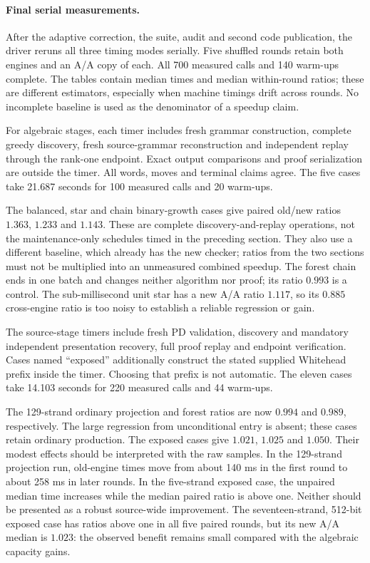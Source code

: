 \paragraph{Final serial measurements.}
After the adaptive correction, the suite, audit and second code publication,
the driver reruns all three timing modes serially. Five shuffled rounds retain
both engines and an A/A copy of each. All 700 measured calls and 140 warm-ups
complete. The tables contain median times and median within-round ratios;
these are different estimators, especially when machine timings drift across
rounds. No incomplete baseline is used as the denominator of a speedup claim.

For algebraic stages, each timer includes fresh grammar construction, complete
greedy discovery, fresh source-grammar reconstruction and independent replay
through the rank-one endpoint. Exact output comparisons and proof serialization
are outside the timer. All words, moves and terminal claims agree. The five
cases take 21.687 seconds for 100 measured calls and 20 warm-ups.



The balanced, star and chain binary-growth cases give paired old/new ratios
$1.363$, $1.233$ and $1.143$. These are complete discovery-and-replay operations,
not the maintenance-only schedules timed in the preceding section. They also
use a different baseline, which already has the new checker; ratios from the
two sections must not be multiplied into an unmeasured combined speedup.
The forest chain ends in one batch and changes neither algorithm nor proof;
its ratio $0.993$ is a control. The sub-millisecond unit star has a new A/A
ratio $1.117$, so its $0.885$ cross-engine ratio is too noisy to establish a
reliable regression or gain.

The source-stage timers include fresh PD validation, discovery and mandatory
independent presentation recovery, full proof replay and endpoint verification.
Cases named ``exposed'' additionally construct the stated supplied Whitehead
prefix inside the timer. Choosing that prefix is not automatic. The eleven
cases take 14.103 seconds for 220 measured calls and 44 warm-ups.



The 129-strand ordinary projection and forest ratios are now $0.994$ and
$0.989$, respectively. The large regression from unconditional entry is absent;
these cases retain ordinary production. The exposed cases give $1.021$,
$1.025$ and $1.050$. Their modest effects should be interpreted with the raw
samples. In the 129-strand projection run, old-engine times move from about
140 ms in the first round to about 258 ms in later rounds. In the five-strand
exposed case, the unpaired median time increases while the median paired ratio
is above one. Neither should be presented as a robust source-wide improvement.
The seventeen-strand, 512-bit exposed case has ratios above one in all five
paired rounds, but its new A/A median is $1.023$: the observed benefit remains
small compared with the algebraic capacity gains.

